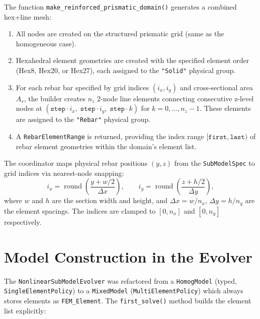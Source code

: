 The function \texttt{make\_reinforced\_prismatic\_domain()} generates
a combined hex+line mesh:

\begin{enumerate}
  \item All nodes are created on the structured prismatic grid
    (same as the homogeneous case).
  \item Hexahedral element geometries are created with the specified
    element order (Hex8, Hex20, or Hex27), each assigned to the
    \texttt{"Solid"} physical group.
  \item For each rebar bar specified by grid indices $(i_x, i_y)$
    and cross-sectional area $A_s$, the builder creates $n_z$ 2-node
    line elements connecting consecutive z-level nodes at
    $(\mathtt{step} \cdot i_x, \; \mathtt{step} \cdot i_y, \;
    \mathtt{step} \cdot k)$ for $k = 0, \ldots, n_z - 1$.
    These elements are assigned to the \texttt{"Rebar"} physical group.
  \item A \texttt{RebarElementRange} is returned, providing the index
    range $[\mathtt{first}, \mathtt{last})$ of rebar element
    geometries within the domain's element list.
\end{enumerate}

The coordinator maps physical rebar positions $(y, z)$ from the
\texttt{SubModelSpec} to grid indices via nearest-node snapping:
\begin{equation}
  \label{eq:rebar-snap}
  i_x = \operatorname{round}\!\left(
    \frac{y + w/2}{\Delta x}\right), \qquad
  i_y = \operatorname{round}\!\left(
    \frac{z + h/2}{\Delta y}\right),
\end{equation}
where $w$ and $h$ are the section width and height, and
$\Delta x = w / n_x$, $\Delta y = h / n_y$ are the element spacings.
The indices are clamped to $[0, n_x]$ and $[0, n_y]$ respectively.


\section{Model Construction in the Evolver}
\label{sec:mixed-evolver}

The \texttt{NonlinearSubModelEvolver} was refactored from a
\texttt{HomogModel} (typed, \texttt{SingleElementPolicy}) to a
\texttt{MixedModel} (\texttt{MultiElementPolicy}) which always stores
elements as \texttt{FEM\_Element}.  The \texttt{first\_solve()} method
builds the element list explicitly:

